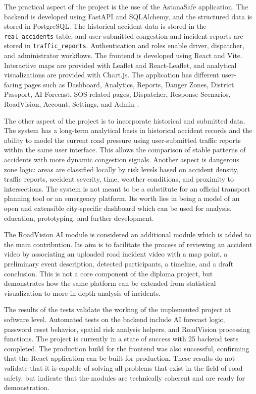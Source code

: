 ﻿\documentclass[12pt,a4paper]{report}
\begin{document}
The practical aspect of the project is the use of the AstanaSafe application. The backend is developed using FastAPI and SQLAlchemy, and the structured data is stored in PostgreSQL. The historical accident data is stored in the \texttt{real\_accidents} table, and user-submitted congestion and incident reports are stored in \texttt{traffic\_reports}. Authentication and roles enable driver, dispatcher, and administrator workflows. The frontend is developed using React and Vite. Interactive maps are provided with Leaflet and React-Leaflet, and analytical visualizations are provided with Chart.js. The application has different user-facing pages such as Dashboard, Analytics, Reports, Danger Zones, District Passport, AI Forecast, SOS-related pages, Dispatcher, Response Scenarios, RoadVision, Account, Settings, and Admin \cite{leafletDocs}.

The other aspect of the project is to incorporate historical and submitted data. The system has a long-term analytical basis in historical accident records and the ability to model the current road pressure using user-submitted traffic reports within the same user interface. This allows the comparison of stable patterns of accidents with more dynamic congestion signals. Another aspect is dangerous zone logic: areas are classified locally by risk levels based on accident density, traffic reports, accident severity, time, weather conditions, and proximity to intersections. The system is not meant to be a substitute for an official transport planning tool or an emergency platform. Its worth lies in being a model of an open and extensible city-specific dashboard which can be used for analysis, education, prototyping, and further development.

The RoadVision AI module is considered an additional module which is added to the main contribution. Its aim is to facilitate the process of reviewing an accident video by associating an uploaded road incident video with a map point, a preliminary event description, detected participants, a timeline, and a draft conclusion. This is not a core component of the diploma project, but demonstrates how the same platform can be extended from statistical visualization to more in-depth analysis of incidents.

The results of the tests validate the working of the implemented project at software level. Automated tests on the backend include AI forecast logic, password reset behavior, spatial risk analysis helpers, and RoadVision processing functions. The project is currently in a state of success with 25 backend tests completed. The production build for the frontend was also successful, confirming that the React application can be built for production. These results do not validate that it is capable of solving all problems that exist in the field of road safety, but indicate that the modules are technically coherent and are ready for demonstration.
\end{document}
